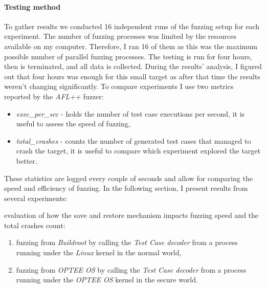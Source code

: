 \paragraph{Testing method}
To gather results we conducted 16 independent runs of the fuzzing setup for each experiment. The number of fuzzing processes was limited by the resources available on my computer. Therefore, I ran 16 of them as this was the maximum possible number of parallel fuzzing processes. The testing is run for four hours, then is terminated, and all data is collected. During the results' analysis, I figured out that four hours was enough for this small target as after that time the results weren't changing significantly. 
To compare experiments I use two metrics reported by the \textit{AFL++} fuzzer:
\begin{itemize}
    \item \textit{exec\_per\_sec} - holds the number of test case executions per second, it is useful to assess the speed of fuzzing,
    \item \textit{total\_crashes} - counts the number of generated test cases that managed to crash the target, it is useful to compare which experiment explored the target better.
\end{itemize}
These statistics are logged every couple of seconds and allow for comparing the speed and efficiency of fuzzing.
In the following section, I present results from several experiments:

    \item evaluation of how the save and restore mechanism impacts fuzzing speed and the total crashes count:
    \begin{enumerate}
        \item fuzzing from \textit{Buildroot} by calling the \textit{Test Case decoder} from a process running under the \textit{Linux} kernel in the normal world,
        \item fuzzing from \textit{OPTEE OS} by calling the \textit{Test Case decoder} from a process running under the \textit{OPTEE OS} kernel in the secure world.
    \end{enumerate}

